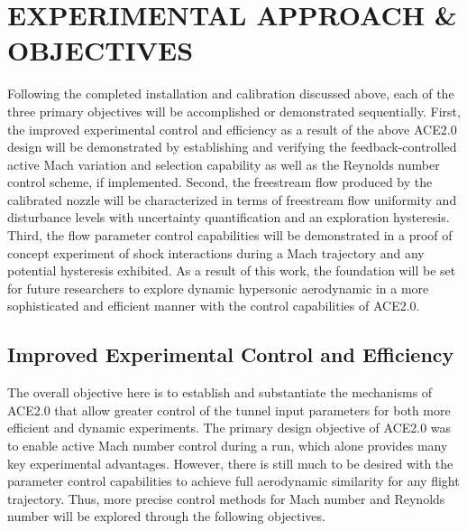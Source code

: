 %
%  
%


\chapter{EXPERIMENTAL APPROACH \& OBJECTIVES}

Following the completed installation and calibration discussed above, each of the three primary objectives will be accomplished or demonstrated sequentially. First, the improved experimental control and efficiency as a result of the above ACE2.0 design will be demonstrated by establishing and verifying the feedback-controlled active Mach variation and selection capability as well as the Reynolds number control scheme, if implemented. Second, the freestream flow produced by the calibrated nozzle will be characterized in terms of freestream flow uniformity and disturbance levels with uncertainty quantification and an exploration hysteresis. Third, the flow parameter control capabilities will be demonstrated in a proof of concept experiment of shock interactions during a Mach trajectory and any potential hysteresis exhibited. As a result of this work, the foundation will be set for future researchers to explore dynamic hypersonic aerodynamic in a more sophisticated and efficient manner with the control capabilities of ACE2.0.

\section{Improved Experimental Control and Efficiency} 

The overall objective here is to establish and substantiate the mechanisms of ACE2.0 that allow greater control of the tunnel input parameters for both more efficient and dynamic experiments. The primary design objective of ACE2.0 was to enable active Mach number control during a run, which alone provides many key experimental advantages. However, there is still much to be desired with the parameter control capabilities to achieve full aerodynamic similarity for any flight trajectory. Thus, more precise control methods for Mach number and Reynolds number will be explored through the following objectives.

